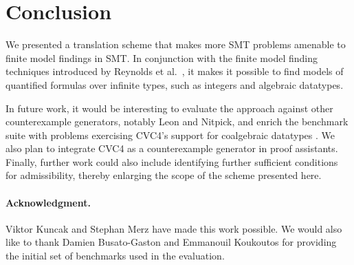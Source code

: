 \documentclass[runningheads,a4paper]{llncs}
\newcommand\cvc{CVC4\xspace}
\newcommand\concret{\gamma} %
\newcommand{\rem}[1]{\textcolor{red}{[#1]}}
\newcommand{\jb}[1]{\rem{#1 --jb}}
\newcommand{\ct}[1]{\rem{#1 --ct}}
\begin{document}



%
%
%

\section{Conclusion}
\label{sec:conclusion}

We presented a translation scheme that makes more SMT problems amenable to
finite model findings in SMT. In conjunction with the finite model finding
techniques introduced by Reynolds et al.\
\cite{ReyEtAl-1-RR-13,reynolds-et-al-2013}, it makes it possible to
find models of quantified formulas over infinite types, such as integers
and algebraic datatypes.

In future work, it would be interesting to evaluate the approach against other
counterexample generators, notably Leon and Nitpick, and enrich the benchmark
suite with problems exercising \cvc's support for coalgebraic datatypes
\cite{reynolds-blanchette-2015-codata}. We also plan to integrate \cvc as a
counterexample generator in proof assistants. Finally, further work could also
include identifying further sufficient conditions for admissibility, thereby
enlarging the scope of the scheme presented here.


{%
\def\ackname{Acknowledgment}
\paragraph{%
\ackname.}
Viktor Kuncak and Stephan Merz have made this work possible. We would also like
to thank Damien Busato-Gaston and Emmanouil Koukoutos for providing the initial
set of benchmarks used in the evaluation.
}



{


}
\end{document}
